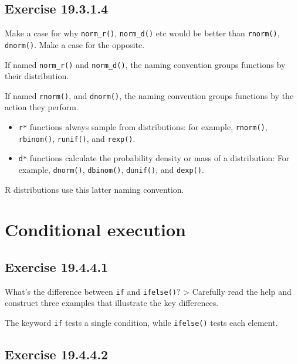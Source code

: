 \documentclass[]{book}
\theoremstyle{plain}
\theoremstyle{remark}
\begin{document}
\hypertarget{exercise-19.3.1.4}{%
\subsection*{\texorpdfstring{Exercise {19.3.1.4}}{Exercise 19.3.1.4}}\label{exercise-19.3.1.4}}

Make a case for why \texttt{norm\_r()}, \texttt{norm\_d()} etc would be better than \texttt{rnorm()}, \texttt{dnorm()}. Make a case for the opposite.

If named \texttt{norm\_r()} and \texttt{norm\_d()}, the naming convention groups functions by their
distribution.

If named \texttt{rnorm()}, and \texttt{dnorm()}, the naming convention groups functions
by the action they perform.

\begin{itemize}
\item
  \texttt{r*} functions always sample from distributions: for example,
  \texttt{rnorm()}, \texttt{rbinom()}, \texttt{runif()}, and \texttt{rexp()}.
\item
  \texttt{d*} functions calculate the probability density or mass of a distribution:
  For example, \texttt{dnorm()}, \texttt{dbinom()}, \texttt{dunif()}, and \texttt{dexp()}.
\end{itemize}

R distributions use this latter naming convention.

\hypertarget{conditional-execution}{%
\section{Conditional execution}\label{conditional-execution}}

\hypertarget{exercise-19.4.4.1}{%
\subsection*{\texorpdfstring{Exercise {19.4.4.1}}{Exercise 19.4.4.1}}\label{exercise-19.4.4.1}}

What's the difference between \texttt{if} and \texttt{ifelse()}? \textgreater{} Carefully read the help and construct three examples that illustrate the key differences.

The keyword \texttt{if} tests a single condition, while \texttt{ifelse()} tests each element.

\hypertarget{exercise-19.4.4.2}{%
\subsection*{\texorpdfstring{Exercise {19.4.4.2}}{Exercise 19.4.4.2}}\label{exercise-19.4.4.2}}
\end{document}
